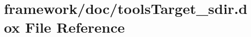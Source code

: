\hypertarget{tools_target__sdir_8dox}{}\section{framework/doc/tools\+Target\+\_\+sdir.dox File Reference}
\label{tools_target__sdir_8dox}
